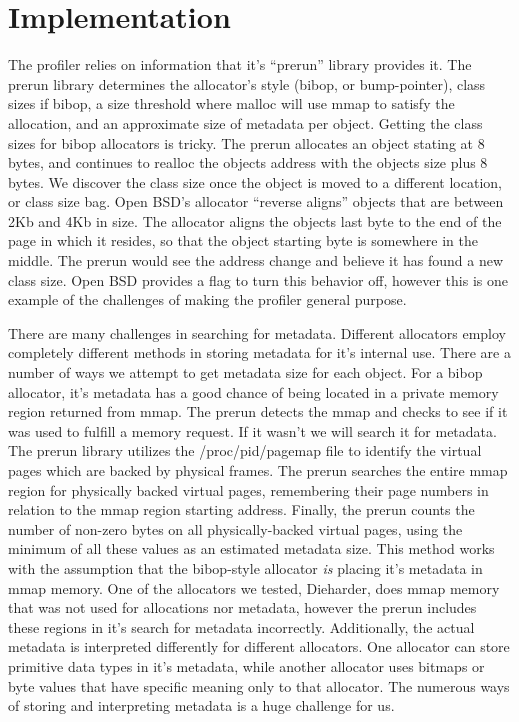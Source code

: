 \section{Implementation}The profiler relies on information that it's ``prerun'' library provides it. The prerun library determines the allocator's style (bibop, or bump-pointer), class sizes if bibop, a size threshold where malloc will use mmap to satisfy the allocation, and an approximate size of metadata per object. Getting the class sizes for bibop allocators is tricky. The prerun allocates an object stating at 8 bytes, and continues to realloc the objects address with the objects size plus 8 bytes. We discover the class size once the object is moved to a different location, or class size bag. Open BSD's allocator ``reverse aligns'' objects that are between 2Kb and 4Kb in size. The allocator aligns the objects last byte to the end of the page in which it resides, so that the object starting byte is somewhere in the middle. The prerun would see the address change and believe it has found a new class size. Open BSD provides a flag to turn this behavior off, however this is one example of the challenges of making the profiler general purpose.

	There are many challenges in searching for metadata. Different allocators employ completely different methods in storing metadata for it's internal use. There are a number of ways we attempt to get metadata size for each object. For a bibop allocator, it's metadata has a good chance of being located in a private memory region returned from mmap. The prerun detects the mmap and checks to see if it was used to fulfill a memory request. If it wasn't we will search it for metadata. The prerun library utilizes the /proc/pid/pagemap file to identify the virtual pages which are backed by physical frames. The prerun searches the entire mmap region for physically backed virtual pages, remembering their page numbers in relation to the mmap region starting address. Finally, the prerun counts the number of non-zero bytes on all physically-backed virtual pages, using the minimum of all these values as an estimated metadata size. This method works with the assumption that the bibop-style allocator \emph{is} placing it's metadata in mmap memory. One of the allocators we tested, Dieharder, does mmap memory that was not used for allocations nor metadata, however the prerun includes these regions in it's search for metadata incorrectly. Additionally, the actual metadata is interpreted differently for different allocators. One allocator can store primitive data types in it's metadata, while another allocator uses bitmaps or byte values that have specific meaning only to that allocator. The numerous ways of storing and interpreting metadata is a huge challenge for us.
		

